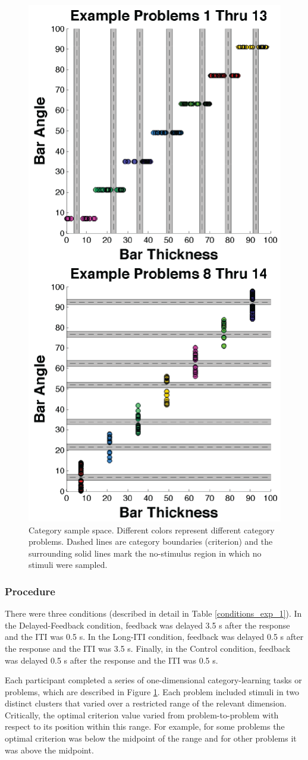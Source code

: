 \documentclass[doc, floatsintext]{apa7}
\begin{document}
\begin{figure}
  \centering
  \includegraphics[width=.5\textwidth]{../figures/fig_design_exp_1_space.png}
  \caption{
      Category sample space. Different colors represent
      different category problems. Dashed lines are category
      boundaries (criterion) and the surrounding solid lines
      mark the no-stimulus region in which no stimuli were
      sampled.
}
  \label{fig_design_exp_1_space}
\end{figure}

\subsubsection{Procedure}
There were three conditions (described in detail in Table
\ref{conditions_exp_1}). In the Delayed-Feedback condition,
feedback was delayed 3.5 s after the response and the ITI
was 0.5 s. In the Long-ITI condition, feedback was delayed
0.5 s after the response and the ITI was 3.5 s. Finally, in
the Control condition, feedback was delayed 0.5 s after the
response and the ITI was 0.5 s.

Each participant completed a series of one-dimensional
category-learning tasks or problems, which are described in
Figure \ref{fig_design_exp_1_space}. Each problem included
stimuli in two distinct clusters that varied over a
restricted range of the relevant dimension. Critically, the
optimal criterion value varied from problem-to-problem with
respect to its position within this range. For example, for
some problems the optimal criterion was below the midpoint
of the range and for other problems it was above the
midpoint. 
\end{document}
